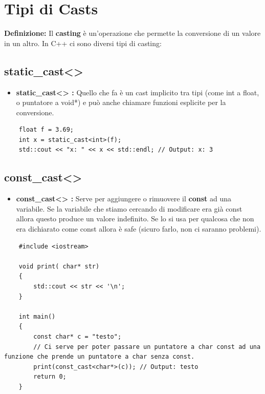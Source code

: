 

\newpage

\section{Tipi di Casts}

\textsf{\small \textbf{Definizione:} Il \textbf{casting} è un'operazione che permette la conversione di un valore in un altro. In C++ ci sono diversi tipi di casting: } \\

\subsection{static\_cast<>}

\begin{itemize}
	\item \textsf{\small \textbf{static\_cast<> :} Quello che fa è un cast implicito tra tipi (come int a float, o puntatore a void*) e può anche chiamare funzioni esplicite per la conversione. }
\end{itemize}

\begin{lstlisting}
	float f = 3.69;
	int x = static_cast<int>(f);
	std::cout << "x: " << x << std::endl; // Output: x: 3 
\end{lstlisting}

\subsection{const\_cast<>}

\begin{itemize}
	\item \textsf{\small \textbf{const\_cast<> :} Serve per aggiungere o rimuovere il \textbf{const} ad una variabile. Se la variabile che stiamo cercando di modificare era già const allora questo produce un valore indefinito. Se lo si usa per qualcosa che non era dichiarato come const allora è safe (sicuro farlo, non ci saranno problemi).  }
\end{itemize}

\begin{lstlisting}
	#include <iostream>
	
	void print( char* str)
	{
		std::cout << str << '\n';
	}

	int main()
	{
		const char* c = "testo";
		// Ci serve per poter passare un puntatore a char const ad una funzione che prende un puntatore a char senza const.
		print(const_cast<char*>(c)); // Output: testo
		return 0;
	}
\end{lstlisting}

